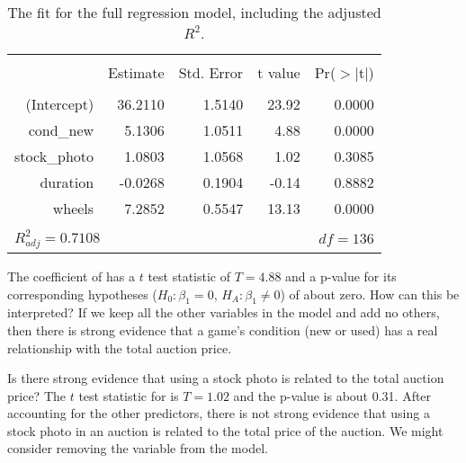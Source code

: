 \textB{\newpage}

\begin{table}[ht]
\centering
\begin{tabular}{rrrrr}
  \hline
  \vspace{-3.7mm} & & & & \\
 & Estimate & Std. Error & t value & Pr($>$$|$t$|$) \\ 
  \hline
  \vspace{-3.8mm} & & & & \\
(Intercept) & 36.2110 & 1.5140 & 23.92 & 0.0000 \\ 
  cond\_\hspace{0.3mm}new & 5.1306 & 1.0511 & 4.88 & 0.0000 \\ 
  stock\_\hspace{0.3mm}photo & 1.0803 & 1.0568 & 1.02 & 0.3085 \\ 
  duration & -0.0268 & 0.1904 & -0.14 & 0.8882 \\ 
  wheels & 7.2852 & 0.5547 & 13.13 & 0.0000 \\ 
   \hline
  \vspace{-3.6mm} & & & & \\
\multicolumn{3}{l}{$R_{adj}^2 = 0.7108$}&\multicolumn{2}{r}{$df=136$}
\end{tabular}
\caption{The fit for the full regression model, including the adjusted $R^2$.}
\label{outputForMultipleRegrOutputForAllPredictors2}
\end{table}

\begin{example}{The coefficient of  has a $t$ test statistic of $T=4.88$ and a p-value for its corresponding hypotheses ($H_0: \beta_1 = 0$, $H_A: \beta_1 \neq 0$) of about zero. How can this be interpreted?}
If we keep all the other variables in the model and add no others, then there is strong evidence that a game's condition (new or used) has a real relationship with the total auction price.
\end{example}

\begin{example}{Is there strong evidence that using a stock photo is related to the total auction price?}
The $t$ test statistic for  is $T=1.02$ and the p-value is about 0.31. After accounting for the other predictors, there is not strong evidence that using a stock photo in an auction is related to the total price of the auction. We might consider removing the  variable from the model.
\end{example}


